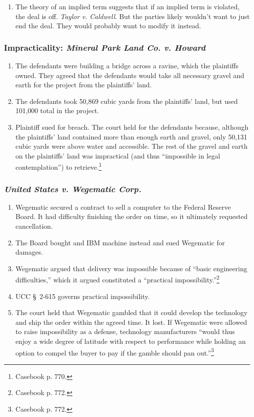 \begin{enumerate}
    \item The theory of an implied term suggests that if an implied term is 
    violated, the deal is off. \emph{Taylor v. Caldwell}. But the parties 
    likely wouldn't want to just end the deal. They would probably want to 
    modify it instead.
\end{enumerate}

\subsubsection{Impracticality: \emph{Mineral Park Land Co. v. Howard}}

\begin{enumerate}
    \item The defendants were building a bridge across a ravine, which the 
    plaintiffs owned. They agreed that the defendants would take all necessary 
    gravel and earth for the project from the plaintiffs' land.
    \item The defendants took 50,869 cubic yards from the plaintiffs' land, 
    but used 101,000 total in the project.
    \item Plaintiff sued for breach. The court held for the defendants 
    because, although the plaintiffs' land contained more than enough earth 
    and gravel, only 50,131 cubic yards were above water and accessible. The 
    rest of the gravel and earth on the plaintiffs' land was impractical (and 
    thus ``impossible in legal contemplation'') to retrieve.\footnote{Casebook 
    p. 770.}
\end{enumerate}

\subsubsection{\emph{United States v. Wegematic Corp.}}

\begin{enumerate}
    \item Wegematic secured a contract to sell a computer to the Federal 
    Reserve Board. It had difficulty finishing the order on time, so it 
    ultimately requested cancellation.
    \item The Board bought and IBM machine instead and sued Wegematic for 
    damages.
    \item Wegematic argued that delivery was impossible because of ``basic 
    engineering difficulties,'' which it argued constituted a ``practical 
    impossibility.''\footnote{Casebook p. 772.}
    \item UCC \S\ 2-615 governs practical impossibility.
    \item The court held that Wegematic gambled that it could develop the 
    technology and ship the order within the agreed time. It lost. If 
    Wegematic were allowed to raise impossibility as a defense, technology 
    manufacturers ``would thus enjoy a wide degree of latitude with respect to 
    performance while holding an option to compel the buyer to pay if the 
    gamble should pan out.''\footnote{Casebook p. 772.}
\end{enumerate}

